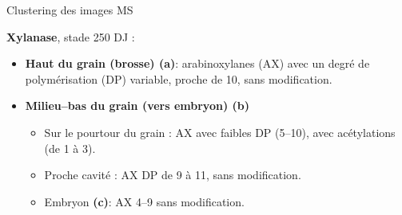 \documentclass[10pt]{beamer}
\begin{document}
\begin{frame}{Clustering des images MS}
  
  \textbf{Xylanase}, stade 250 DJ :
    \begin{itemize}
    \item \textbf{Haut du grain (brosse) (a)}: arabinoxylanes (AX) avec un degré de polymérisation (DP) variable, proche de 10, sans modification.
    \item \textbf{Milieu--bas du grain (vers embryon) (b)}
      \begin{itemize}
      \item Sur le pourtour du grain : AX avec faibles DP (5--10), avec acétylations (de 1 à 3).
      \item Proche cavité : AX DP de 9 à 11, sans modification.
      \item Embryon \textbf{(c)}: AX 4--9 sans modification.
      \end{itemize}
    \end{itemize}


\end{frame}
\end{document}
